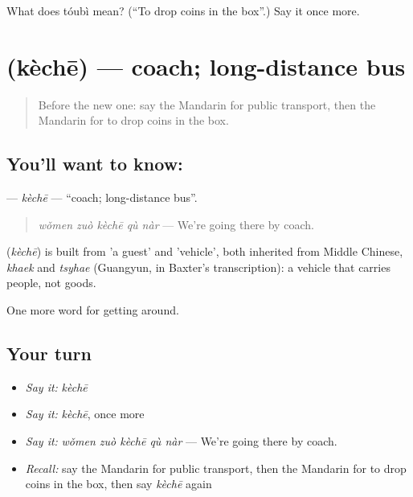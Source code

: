 \begin{tcolorbox}[breakable,colback=teal!4,colframe=teal!35!black,title={Before you move on}]
What does tóubì mean? (\textquotedblleft{}To drop coins in the box\textquotedblright{}.) Say it once more.
\end{tcolorbox}
\section[\texorpdfstring{\zh{客车} (kèchē)}{客车 (kèchē)}]{ (kèchē) — coach; long-distance bus}

\label{lesson:ZH-C408-keche}



\begin{quote}
Before the new one: say the Mandarin for public transport, then the Mandarin for to drop coins in the box.
\end{quote}

\subsection*{You'll want to know: }
\textbf{} — \emph{kèchē} — \textquotedblleft{}coach; long-distance bus\textquotedblright{}.

\begin{quote}
\textbf{} \emph{wǒmen zuò kèchē qù nàr} — We're going there by coach.
\end{quote}

\begin{cousinweb}
\textbf{} (\emph{kèchē}) is built from  'a guest' and  'vehicle', both inherited from Middle Chinese, \emph{khaek} and \emph{tsyhae} (Guangyun, in Baxter's transcription): a vehicle that carries people, not goods.
\end{cousinweb}

\begin{grammarlens}[title={What you've built}]
One more word for getting around.
\end{grammarlens}

\subsection*{Your turn}
\begin{itemize}
\raggedright
  \item \emph{Say it:} \emph{kèchē}
  \item \emph{Say it:} \emph{kèchē}, once more
  \item \emph{Say it:} \emph{wǒmen zuò kèchē qù nàr} — We're going there by coach.
  \item \emph{Recall:} say the Mandarin for public transport, then the Mandarin for to drop coins in the box, then say \emph{kèchē} again
\end{itemize}

